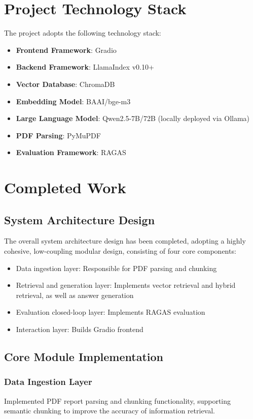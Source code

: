 \documentclass[12pt, a4paper]{article}
\begin{document}
\section{Project Technology Stack}

The project adopts the following technology stack:
\begin{itemize}
    \item \textbf{Frontend Framework}: Gradio
    \item \textbf{Backend Framework}: LlamaIndex v0.10+
    \item \textbf{Vector Database}: ChromaDB
    \item \textbf{Embedding Model}: BAAI/bge-m3
    \item \textbf{Large Language Model}: Qwen2.5-7B/72B (locally deployed via Ollama)
    \item \textbf{PDF Parsing}: PyMuPDF
    \item \textbf{Evaluation Framework}: RAGAS
\end{itemize}

\section{Completed Work}

\subsection{System Architecture Design}
The overall system architecture design has been completed, adopting a highly
cohesive, low-coupling modular design, consisting of four core components:
\begin{itemize}
    \item Data ingestion layer: Responsible for PDF parsing and chunking
    \item Retrieval and generation layer: Implements vector retrieval and hybrid
          retrieval, as well as answer generation
    \item Evaluation closed-loop layer: Implements RAGAS evaluation
    \item Interaction layer: Builds Gradio frontend
\end{itemize}

\subsection{Core Module Implementation}

\subsubsection{Data Ingestion Layer}
Implemented PDF report parsing and chunking functionality, supporting semantic
chunking to improve the accuracy of information retrieval.
\end{document}
